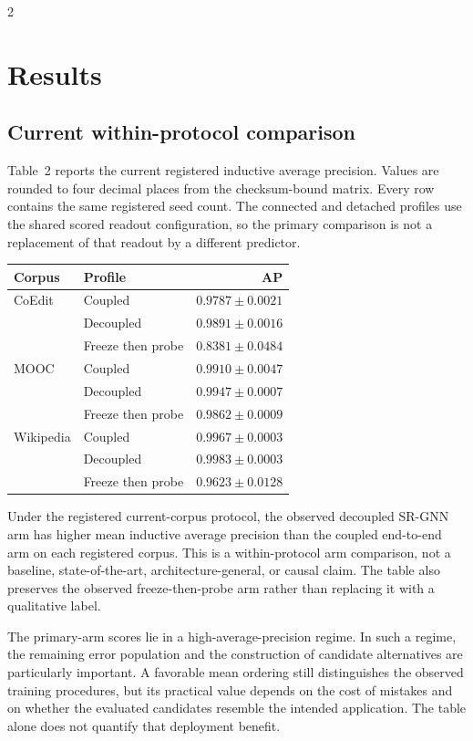 \documentclass[a4paper,10pt]{article}
\renewcommand{\small}{\fontsize{8}{12}\selectfont}
\begin{document}
\begin{multicols}{2}
\section{Results}
\subsection{Current within-protocol comparison}
Table~2 reports the current registered inductive average precision. Values are rounded to four decimal places from the checksum-bound matrix. Every row contains the same registered seed count. The connected and detached profiles use the shared scored readout configuration, so the primary comparison is not a replacement of that readout by a different predictor.

\begin{center}
\small
\begin{tabular}{@{}llr@{}}
\toprule
Corpus & Profile & AP\\ \midrule
CoEdit & Coupled & $0.9787\pm0.0021$\\
 & Decoupled & $\mathbf{0.9891\pm0.0016}$\\
 & Freeze then probe & $0.8381\pm0.0484$\\
MOOC & Coupled & $0.9910\pm0.0047$\\
 & Decoupled & $\mathbf{0.9947\pm0.0007}$\\
 & Freeze then probe & $0.9862\pm0.0009$\\
Wikipedia & Coupled & $0.9967\pm0.0003$\\
 & Decoupled & $\mathbf{0.9983\pm0.0003}$\\
 & Freeze then probe & $0.9623\pm0.0128$\\
\bottomrule
\end{tabular}
\end{center}


Under the registered current-corpus protocol, the observed decoupled SR-GNN arm has higher mean inductive average precision than the coupled end-to-end arm on each registered corpus. This is a within-protocol arm comparison, not a baseline, state-of-the-art, architecture-general, or causal claim. The table also preserves the observed freeze-then-probe arm rather than replacing it with a qualitative label.

The primary-arm scores lie in a high-average-precision regime. In such a regime, the remaining error population and the construction of candidate alternatives are particularly important. A favorable mean ordering still distinguishes the observed training procedures, but its practical value depends on the cost of mistakes and on whether the evaluated candidates resemble the intended application. The table alone does not quantify that deployment benefit.


\end{multicols}
\end{document}
